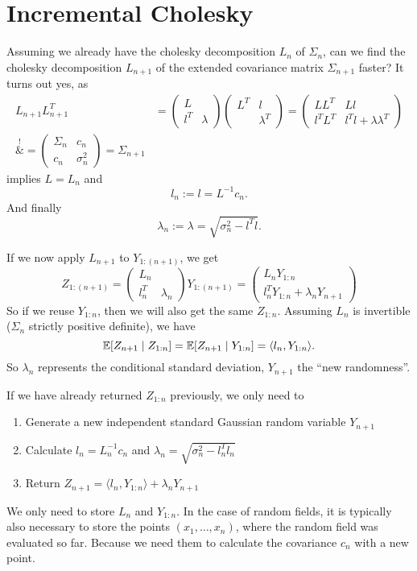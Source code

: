 \section{Incremental Cholesky}

Assuming we already have the cholesky decomposition \(L_n\) of \(\Sigma_n\),
can we find the cholesky decomposition \(L_{n+1}\) of the extended covariance
matrix \(\Sigma_{n+1}\) faster? It turns out yes, as
\[
	\begin{aligned}
	L_{n+1}L_{n+1}^T
	&=\begin{pmatrix}
		L & \\
		l^T &\lambda
	\end{pmatrix}
	\begin{pmatrix}
		L^T &  l\\
		&\lambda^T
	\end{pmatrix}
	= \begin{pmatrix}
		L L^T & L l\\
		l^T L^T & l^T l + \lambda\lambda^T
	\end{pmatrix}\\
	\overset!&= \begin{pmatrix}
		\Sigma_n & c_n \\
		c_n & \sigma_n^2
	\end{pmatrix} = \Sigma_{n+1}
	\end{aligned}
\]
implies \(L = L_n\) and
\[
	l_n := l = L^{-1}c_n.
\]
And finally
\[
	\lambda_n := \lambda = \sqrt{\sigma_n^2 - l^T l}.
\]

If we now apply \(L_{n+1}\) to \(Y_{1:(n+1)}\), we get
\[
	Z_{1:(n+1)}
	= \begin{pmatrix}
		L_n & \\
		l_n^T & \lambda_n
	\end{pmatrix}
	Y_{1:(n+1)}
	= \begin{pmatrix}
		L_n Y_{1:n} \\
	 	l_n^T Y_{1:n} + \lambda_n Y_{n+1}
	\end{pmatrix}
\]
So if we reuse \(Y_{1:n}\), then we will also get the same \(Z_{1:n}\). Assuming
\(L_n\) is invertible (\(\Sigma_n\) strictly positive definite), we have
\[
	\mathbb{E}[Z_{n+1}\mid Z_{1:n}]
	= \mathbb{E}[Z_{n+1}\mid Y_{1:n}] = \langle l_n, Y_{1:n}\rangle.
\]
So \(\lambda_n\) represents the conditional standard deviation, \(Y_{n+1}\) the
``new randomness''.

If we have already returned \(Z_{1:n}\) previously, we only need to
\begin{enumerate}
	\item Generate a new independent standard Gaussian random variable \(Y_{n+1}\)
	\item Calculate \(l_n = L_n^{-1}c_n\) and \(\lambda_n = \sqrt{\sigma_n^2- l_n^T l_n}\)
	\item Return \(Z_{n+1} = \langle l_n, Y_{1:n}\rangle + \lambda_n Y_{n+1}\)
\end{enumerate}
We only need to store \(L_n\) and \(Y_{1:n}\). In the case of random fields,
it is typically also necessary to store the points \((x_1,\dots, x_n)\), where
the random field was evaluated so far. Because we need them to calculate the
covariance \(c_n\) with a new point.


